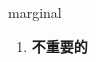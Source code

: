 
\begin{frame}
{\huge marginal}
\begin{center}
\begin{enumerate}\Large
  \item \textbf{不重要的}
\end{enumerate}
\end{center}
\end{frame}
